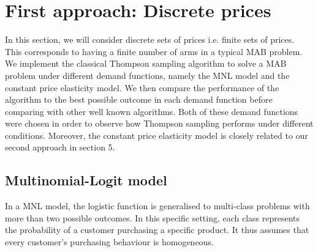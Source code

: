 \documentclass[a4paper]{article}
\begin{document}
\section{First approach: Discrete prices}
In this section, we will consider discrete sets of prices i.e. finite sets of prices. This corresponds to having a finite number of arms in a typical MAB problem. We implement the classical Thompson sampling algorithm to solve a MAB problem under different demand functions, namely the MNL model and the constant price elasticity model. We then compare the performance of the algorithm to the best possible outcome in each demand function before comparing with other well known algorithms. Both of these demand functions were chosen in order to observe how Thompson sampling performs under different conditions. Moreover, the constant price elasticity model is closely related to our second approach in section 5.

\subsection{Multinomial-Logit model}
In a MNL model, the logistic function is generalised to multi-class problems with more than two possible outcomes. In this specific setting, each class represents the probability of a customer purchasing a specific product. It thus assumes that every customer's purchasing behaviour is homogeneous.
\end{document}
